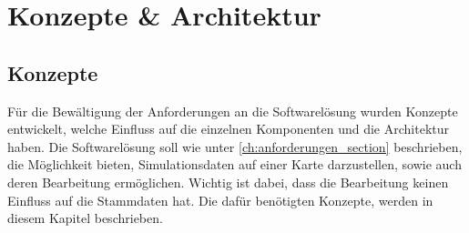 \chapter{Konzepte \& Architektur}
\label{ch:konzepte_architektur}
\section{Konzepte}
Für die Bewältigung der Anforderungen an die Softwarelösung wurden Konzepte entwickelt, welche Einfluss auf die einzelnen Komponenten und die Architektur haben. Die Softwarelösung soll wie unter \ref{ch:anforderungen_section}  beschrieben,  die Möglichkeit bieten, Simulationsdaten auf einer Karte darzustellen, sowie auch deren Bearbeitung ermöglichen. Wichtig ist dabei, dass die Bearbeitung keinen Einfluss auf die Stammdaten hat. Die dafür benötigten Konzepte, werden in diesem Kapitel beschrieben.
